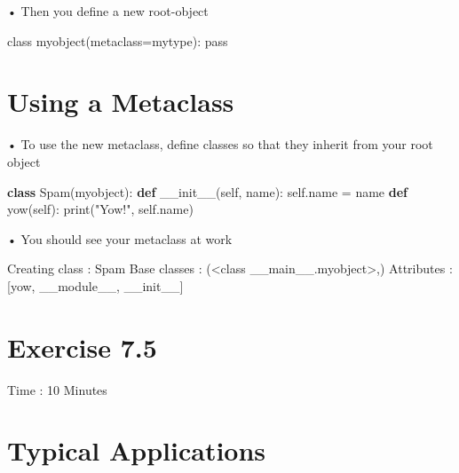 \documentclass[
  letterpaper,
  DIV=11,
  numbers=noendperiod]{scrreprt}
\newenvironment{Shaded}{\begin{snugshade}}{\end{snugshade}}
\newcommand{\BuiltInTok}[1]{\textcolor[rgb]{0.00,0.23,0.31}{#1}}
\newcommand{\FunctionTok}[1]{\textcolor[rgb]{0.28,0.35,0.67}{#1}}
\newcommand{\KeywordTok}[1]{\textcolor[rgb]{0.00,0.23,0.31}{\textbf{#1}}}
\newcommand{\NormalTok}[1]{\textcolor[rgb]{0.00,0.23,0.31}{#1}}
\newcommand{\OperatorTok}[1]{\textcolor[rgb]{0.37,0.37,0.37}{#1}}
\newcommand{\StringTok}[1]{\textcolor[rgb]{0.13,0.47,0.30}{#1}}
\newcommand{\VariableTok}[1]{\textcolor[rgb]{0.07,0.07,0.07}{#1}}
\begin{document}
• Then you define a new root-object

class myobject(metaclass=mytype): pass


\chapter{Using a Metaclass}\label{using-a-metaclass}

• To use the new metaclass, define classes so that they inherit from
your root object

\begin{Shaded}
\begin{Highlighting}[]
\KeywordTok{class}\NormalTok{ Spam(myobject):}
    \KeywordTok{def} \FunctionTok{\_\_init\_\_}\NormalTok{(}\VariableTok{self}\NormalTok{, name):}
        \VariableTok{self}\NormalTok{.name }\OperatorTok{=}\NormalTok{ name}
    \KeywordTok{def}\NormalTok{ yow(}\VariableTok{self}\NormalTok{):}
        \BuiltInTok{print}\NormalTok{(}\StringTok{"Yow!"}\NormalTok{, }\VariableTok{self}\NormalTok{.name) }
\end{Highlighting}
\end{Shaded}

• You should see your metaclass at work

\begin{Shaded}
\begin{Highlighting}[]
\NormalTok{Creating class : Spam  }
\NormalTok{Base classes : (\textless{}class \textquotesingle{}\_\_main\_\_.myobject\textquotesingle{}\textgreater{},)  }
\NormalTok{Attributes : [\textquotesingle{}yow\textquotesingle{}, \textquotesingle{}\_\_module\_\_\textquotesingle{}, \textquotesingle{}\_\_init\_\_\textquotesingle{}] }
\end{Highlighting}
\end{Shaded}


\chapter{Exercise 7.5}\label{exercise-7.5}

Time : 10 Minutes


\chapter{Typical Applications}\label{typical-applications}
\end{document}
